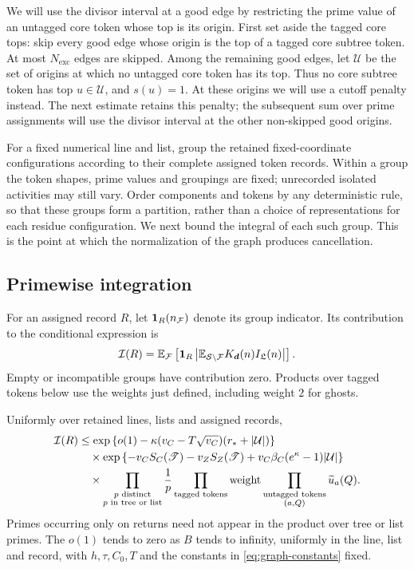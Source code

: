 We will use the divisor interval at a good edge by restricting the prime
value of an untagged core token whose top is its origin.  First set aside
the tagged core tops: skip every good edge whose origin is the top of a
tagged core subtree token.  At most $N_{\mathrm{exc}}$ edges are skipped.
Among the remaining good edges, let $\mathcal U$ be the set of origins
at which no untagged core token has its top.  Thus no core subtree token
has top $u\in\mathcal U$, and $s(u)=1$.  At these origins we will use
a cutoff penalty instead.  The next estimate retains this penalty;
the subsequent sum over prime assignments will use the divisor interval
at the other non-skipped good origins.

For a fixed numerical line and list, group the retained fixed-coordinate
configurations according to their complete assigned token records.
Within a group the token shapes, prime values and groupings are fixed;
unrecorded isolated activities may still vary.  Order components and
tokens by any deterministic rule, so that these groups form a
partition, rather than a choice of representations for each residue
configuration.  We next bound the integral of each such group.  This is
the point at which the normalization of the graph produces cancellation.

\subsection{Primewise integration}

For an assigned record $R$, let $\mathbf 1_R(n_{\mathcal F})$ denote its group
indicator.  Its contribution to the conditional expression is
\[
 \mathcal I(R)=
 \mathbb E_{\mathcal F}\left[
  \mathbf 1_R\left|
   \mathbb E_{\mathcal S\setminus\mathcal F}
       K_{\boldsymbol d}(n)I_{\mathfrak L}(n)
       \right|\right].
\]
Empty or incompatible groups have contribution zero.  Products over
tagged tokens below use the weights just defined, including weight $2$
for ghosts.

\begin{lemma}\label{lem:trace-integration}
Uniformly over retained lines, lists and assigned records,
\begin{align}
 \mathcal I(R)
 &\le
 \exp\left\{
 o(1)-\kappa(v_C-T\sqrt{v_C})(r_*+|\mathcal U|)\right\}
 \notag\\
 &\quad\times\exp\left\{
 -v_CS_C(\mathscr T)-v_ZS_Z(\mathscr T)
 +v_C\beta_C(e^\kappa-1)|\mathcal U|\right\}
 \notag\\
 &\quad\times\prod_{\substack{p\text{ distinct}\\
                  p\text{ in tree or list}}}\frac1p
 \prod_{\text{tagged tokens}}\mathrm{weight}
 \prod_{\substack{\text{untagged tokens}\\(a,Q)}}\widetilde u_a(Q).
 \label{eq:trace-integration}
\end{align}
Primes occurring only on returns need not appear in the product over
tree or list primes.  The $o(1)$ tends to zero as $B$ tends to infinity,
uniformly in the line, list and record, with $h,\tau,C_0,T$ and the
constants in \eqref{eq:graph-constants} fixed.
\end{lemma}

